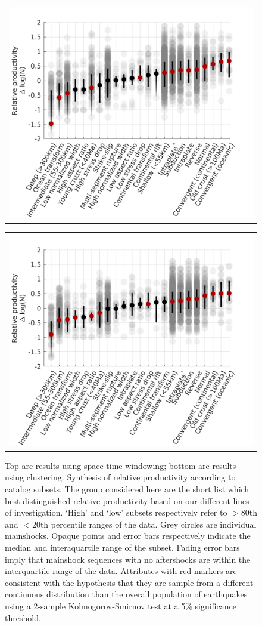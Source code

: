 \documentclass[draft]{agujournal}
\begin{document}
\newpage
\begin{figure}[H]
    \centering
    \begin{tabular}{@{}c@{}}
        \includegraphics[width=0.6\linewidth]{figures/cal_tech.png}
    \end{tabular}
    
    \begin{tabular}{@{}c@{}}
        \includegraphics[width=0.6\linewidth]{figures/cal_tech_z2008.png}
    \end{tabular}
    
    \caption{Top are results using space-time windowing; bottom are results using \citet{Zaliapin2008} clustering. Synthesis of relative productivity according to catalog subsets. The group considered here are the short list which best distinguished relative productivity based on our different lines of investigation. `High' and `low' subsets respectively refer to $>\!\!80$th and $<\!\!20$th percentile ranges of the data. Grey circles are individual mainshocks. Opaque points and error bars respectively indicate the median and interaquartile range of the subset. Fading error bars imply that mainshock sequences with no aftershocks are within the interquartile range of the data. Attributes with red markers are consistent with the hypothesis that they are sample from a different continuous distribution than the overall population of earthquakes using a 2-sample Kolmogorov-Smirnov test at a 5\% significance threshold.}
        \label{fig:caltechzaliapin}
\end{figure}
\end{document}
